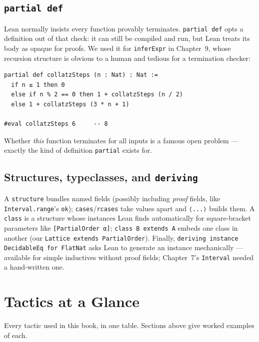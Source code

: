 \documentclass[12pt, a4paper, openright]{book}
\theoremstyle{thmstyle}
\theoremstyle{defstyle}
\newcommand{\lc}[1]{\texttt{#1}}
\begin{document}
\subsection*{\lc{partial def}}

Lean normally insists every function provably terminates. \lc{partial def}
opts a definition out of that check: it can still be compiled and run, but
Lean treats its body as opaque for proofs. We used it for \lc{inferExpr}
in Chapter~9, whose recursion structure is obvious to a human and tedious
for a termination checker:

\begin{verbatim}
partial def collatzSteps (n : Nat) : Nat :=
  if n ≤ 1 then 0
  else if n % 2 == 0 then 1 + collatzSteps (n / 2)
  else 1 + collatzSteps (3 * n + 1)

#eval collatzSteps 6     -- 8
\end{verbatim}

Whether \emph{this} function terminates for all inputs is a famous open
problem --- exactly the kind of definition \lc{partial} exists for.

\subsection*{Structures, typeclasses, and \lc{deriving}}

A \lc{structure} bundles named fields (possibly including \emph{proof}
fields, like \lc{Interval.range}'s \lc{ok}); \lc{cases}/\lc{rcases} take
values apart and \lc{⟨...⟩} builds them. A \lc{class} is a structure whose
instances Lean finds automatically for square-bracket parameters like
\lc{[PartialOrder α]}; \lc{class B extends A} embeds one class in another
(our \lc{Lattice extends PartialOrder}). Finally,
\lc{deriving instance DecidableEq for FlatNat} asks Lean to generate an
instance mechanically --- available for simple inductives without proof
fields; Chapter~7's \lc{Interval} needed a hand-written one.

\section{Tactics at a Glance}

Every tactic used in this book, in one table. Sections above give worked
examples of each.
\end{document}
